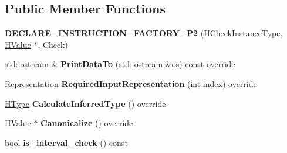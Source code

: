 \subsection*{Public Member Functions}
\begin{DoxyCompactItemize}
\item 
{\bfseries D\+E\+C\+L\+A\+R\+E\+\_\+\+I\+N\+S\+T\+R\+U\+C\+T\+I\+O\+N\+\_\+\+F\+A\+C\+T\+O\+R\+Y\+\_\+\+P2} (\hyperlink{classv8_1_1internal_1_1_h_check_instance_type}{H\+Check\+Instance\+Type}, \hyperlink{classv8_1_1internal_1_1_h_value}{H\+Value} $\ast$, Check)\hypertarget{classv8_1_1internal_1_1_h_check_instance_type_a3a0846ea23645cb053829efb99fa2d78}{}\label{classv8_1_1internal_1_1_h_check_instance_type_a3a0846ea23645cb053829efb99fa2d78}

\item 
std\+::ostream \& {\bfseries Print\+Data\+To} (std\+::ostream \&os) const  override\hypertarget{classv8_1_1internal_1_1_h_check_instance_type_a622fb4f92e3980f11e8580d0bfc706c5}{}\label{classv8_1_1internal_1_1_h_check_instance_type_a622fb4f92e3980f11e8580d0bfc706c5}

\item 
\hyperlink{classv8_1_1internal_1_1_representation}{Representation} {\bfseries Required\+Input\+Representation} (int index) override\hypertarget{classv8_1_1internal_1_1_h_check_instance_type_ad97cb3f6878cfc98f3221bb6052127b9}{}\label{classv8_1_1internal_1_1_h_check_instance_type_ad97cb3f6878cfc98f3221bb6052127b9}

\item 
\hyperlink{classv8_1_1internal_1_1_h_type}{H\+Type} {\bfseries Calculate\+Inferred\+Type} () override\hypertarget{classv8_1_1internal_1_1_h_check_instance_type_abf880d41e7b5d58a4731753a62b43994}{}\label{classv8_1_1internal_1_1_h_check_instance_type_abf880d41e7b5d58a4731753a62b43994}

\item 
\hyperlink{classv8_1_1internal_1_1_h_value}{H\+Value} $\ast$ {\bfseries Canonicalize} () override\hypertarget{classv8_1_1internal_1_1_h_check_instance_type_a4d7337f540907f66903993dbc8a15a17}{}\label{classv8_1_1internal_1_1_h_check_instance_type_a4d7337f540907f66903993dbc8a15a17}

\item 
bool {\bfseries is\+\_\+interval\+\_\+check} () const \hypertarget{classv8_1_1internal_1_1_h_check_instance_type_a4c583dfe7f9bfce57e753fdd9e997b1b}{}\label{classv8_1_1internal_1_1_h_check_instance_type_a4c583dfe7f9bfce57e753fdd9e997b1b}


\end{DoxyCompactItemize}
